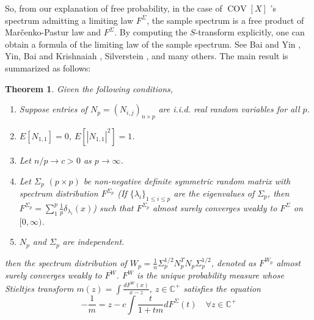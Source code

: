 \documentclass[12pt]{amsart}
\newtheorem{theorem}{Theorem}[section]
\theoremstyle{definition}
\DeclareMathOperator{\Cov}{COV}
\numberwithin{equation}{section}
\numberwithin{equation}{section}
\theoremstyle{remark}
\numberwithin{equation}{section}
\begin{document}
So, from our explanation of free probability, in the  case of  $\Cov[{X}]$ 's spectrum admitting a limiting law $F^{\Sigma}$, the sample spectrum is a free product of Mar{\v c}enko-Pastur law and $F^{\Sigma}$. By computing the $S$-transform explicitly, one can obtain a formula of the limiting law of the sample spectrum. See Bai and Yin \cite{bai1988convergence}, Yin, Bai and Krishnaiah \cite{yin1983limiting}, Silverstein \cite{silverstein1995strong}, and many others. The main result is summarized as follows:

\begin{theorem}
	Given the following conditions,
	\begin{enumerate}
		\item{} 	Suppose entries of $N_p=(N_{i,j})_{n\times p}$ are i.i.d. real random variables for all $p$.
		
		\item{} $E[N_{1,1}]=0$, $E[|N_{1,1}|^2]=1$.
		
		\item{} Let $n/p \to c >0$ as $p\to \infty$.
		
		\item{} Let $\Sigma_p$ $(p\times p)$ be non-negative definite symmetric random matrix with spectrum distribution $F^{\Sigma_p}$ (If $\{\lambda_i\}_{1\le i \le p}$ are the eigenvalues of $\Sigma_p$, then $F^{\Sigma_p}=\sum_{1}^{p} \frac{1}{p} \delta_{\lambda_i}(x)$)  such that $F^{\Sigma_p}$ almost surely converges weakly to $F^{\Sigma}$ on $[0, \infty)$.
		
		\item{} $N_p$ and ${\Sigma}_p$ are independent.
	\end{enumerate}
	then the spectrum distribution of $W_p= \frac{1}{n}{\Sigma}_p^{1/2}N_p^T N_p {\Sigma}_p^{1/2}$, denoted as $F^{W_p}$  almost surely converges weakly to $F^W$. $F^W$ is the unique probability measure whose Stieltjes transform $m(z)= \int \frac{d F^W(x)}{x-z}$, $z\in \mathbb{C}^+$ satisfies the equation
	\begin{equation} \label{eqn:sample spectrum}
	-\frac{1}{m}=z- c\int \frac{t }{1+tm} d F^{\Sigma}(t) \quad \forall z \in \mathbb{C}^+
	\end{equation}
	
\end{theorem}
\end{document}
